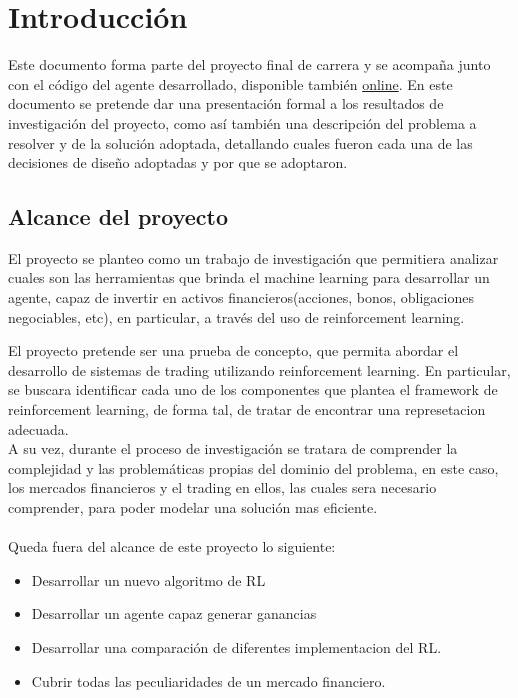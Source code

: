 \chapter{Introducción}

Este documento forma parte del proyecto final de carrera y se acompaña junto con el código del agente desarrollado, disponible también \href{https://github.com/jcaramello/deepQ-stock/}{online}. En este documento se pretende dar una presentación formal a los resultados de investigación del proyecto, como así también una descripción del problema a resolver y de la solución adoptada, detallando cuales fueron cada una de las decisiones de diseño adoptadas y por que se adoptaron.

\section{Alcance del proyecto}
El proyecto se planteo como un trabajo de investigación que permitiera analizar cuales son las herramientas que brinda el machine learning para desarrollar un agente, capaz de invertir en activos financieros(acciones, bonos, obligaciones negociables, etc), en particular, a través  del uso de reinforcement learning.

El proyecto pretende ser una prueba de concepto, que permita abordar el desarrollo de sistemas de trading utilizando reinforcement learning. En particular, se buscara identificar cada uno de los componentes que plantea el framework de reinforcement learning, de forma tal, de tratar de encontrar una represetacion adecuada.
\\
A su vez, durante el proceso de investigación se tratara de comprender la complejidad y las problemáticas propias del dominio del problema, en este caso, los mercados financieros y el trading en ellos, las cuales sera necesario comprender, para poder modelar una solución mas eficiente.
\\
\\
Queda fuera del alcance de este proyecto lo siguiente:

\begin{itemize} %
	\item Desarrollar un nuevo algoritmo de RL
	\item Desarrollar un agente capaz generar ganancias
	\item Desarrollar una comparación de diferentes implementacion del RL.
    \item Cubrir todas las peculiaridades de un mercado financiero.
\end{itemize}

